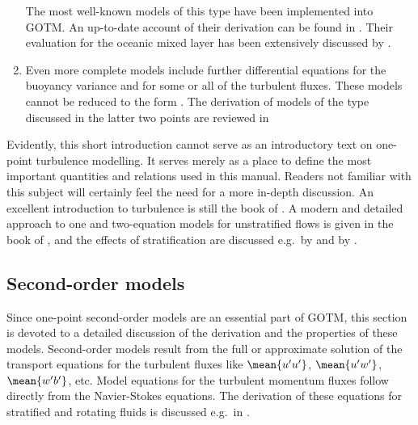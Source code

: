 \begin{enumerate}
 The most well-known  models of this type have been
 implemented into GOTM. An up-to-date account of their derivation can
 be found in \cite{Canutoetal2001a}. Their evaluation for the oceanic
 mixed layer has been extensively discussed by
 \cite{BurchardBolding2001}.
\item Even more complete models include further differential equations for the
 buoyancy variance and for some or all of the turbulent fluxes. These
 models cannot be reduced to the form . The derivation of models
 of the type discussed in the latter two points are reviewed in 
\end{enumerate}

Evidently, this short introduction cannot serve as an
introductory text on one-point turbulence modelling. It serves merely
as a place to define the most important quantities and relations used
in this manual. Readers not familiar with this subject will certainly
feel the need for a more in-depth discussion. An excellent introduction
to turbulence is still the book of \cite{TennekesLumley72}. A modern
and detailed approach to one and two-equation models for unstratified
flows is given in the book of \cite{Wilcox98}, and the effects of
stratification are discussed e.g.\ by \cite{Rodi87} and by
\cite{Burchard2002a}.



\subsection{Second-order models\label{sec:secondOrder}}

Since one-point second-order models are an essential part of GOTM,
this section is devoted to a detailed discussion of the derivation and
the properties of these models. Second-order models result from the
full or approximate solution of the transport equations for the
turbulent fluxes like $\mean{u'u'}$, $\mean{u'w'}$, $\mean{w'b'}$,
etc. Model equations for the turbulent momentum fluxes follow directly
from the Navier-Stokes equations. The derivation of these equations
for stratified and rotating fluids is discussed e.g.\ in
\cite{Sander98a}.

